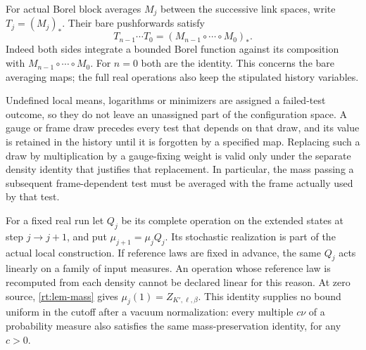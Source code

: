 \documentclass[11pt,letterpaper,reqno]{amsart}
\numberwithin{equation}{section}
\theoremstyle{definition}
\theoremstyle{remark}
\begin{document}
For actual Borel block averages $M_j$ between the successive
link spaces, write $T_j=(M_j)_*$. Their bare pushforwards satisfy
\[
 T_{n-1}\cdots T_0=(M_{n-1}\circ\cdots\circ M_0)_*.
\]
Indeed both sides integrate a bounded Borel function against its
composition with $M_{n-1}\circ\cdots\circ M_0$. For $n=0$ both
are the identity. This concerns the bare averaging maps; the
full real operations also keep the stipulated history variables.

Undefined local means, logarithms or minimizers are assigned a
failed-test outcome, so they do not leave an unassigned part of
the configuration space. A gauge or frame draw precedes every
test that depends on that draw, and its value is retained in the
history until it is forgotten by a specified map. Replacing such
a draw by multiplication by a gauge-fixing weight is valid only
under the separate density identity that justifies that replacement.
In particular, the mass passing a subsequent frame-dependent test
must be averaged with the frame actually used by that test.

For a fixed real run let $Q_j$ be its complete operation on the
extended states at step $j\to j+1$, and put
$\mu_{j+1}=\mu_jQ_j$. Its stochastic realization is part of the
actual local construction. If reference laws are fixed in advance,
the same $Q_j$ acts linearly on a family of input measures. An
operation whose reference law is recomputed from each density
cannot be declared linear for this reason. At zero source,
\cref{rt:lem-mass} gives $\mu_j(1)=Z_{K',\ell,\beta}$.
This identity supplies no bound uniform in the cutoff after a vacuum
normalization: every multiple $c\nu$ of a probability measure
also satisfies the same mass-preservation identity, for any $c>0$.
\end{document}
